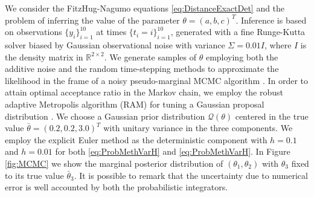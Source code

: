 \documentclass{siamart1116}
\numberwithin{theorem}{section}
\newcommand{\R}{\mathbb{R}}
\begin{document}
We consider the FitzHug-Nagumo equations \eqref{eq:DistanceExactDet} and the problem of inferring the value of the parameter $\theta = (a, b, c)^T$. Inference is based on observations $\{y_i\}_{i=1}^{10}$ at times $\{t_i = i\}_{i=1}^{10}$, generated with a fine Runge-Kutta solver biased by Gaussian observational noise with variance $\Sigma = 0.01I$, where $I$ is the density matrix in $\R^{2\times 2}$. We generate samples of $\theta$ employing both the additive noise and the random time-stepping methods to approximate the likelihood in the frame of a noisy pseudo-marginal MCMC algorithm \cite{AnR09, MLR16}. In order to attain optimal acceptance ratio in the Markov chain, we employ the robust adaptive Metropolis algorithm (RAM) for tuning a Gaussian proposal distribution \cite{Vih12}. We choose a Gaussian prior distribution $\mathcal{Q}(\theta)$ centered in the true value $\bar \theta = (0.2, 0.2, 3.0)^T$ with unitary variance in the three components. We employ the explicit Euler method as the deterministic component with $h = 0.1$ and $h = 0.01$ for both \eqref{eq:ProbMethVarH} and \eqref{eq:ProbMethVarH}. In Figure \ref{fig:MCMC} we show the marginal posterior distribution of $(\theta_1, \theta_2)$ with $\theta_3$ fixed to its true value $\bar\theta_3$. It is possible to remark that the uncertainty due to numerical error is well accounted by both the probabilistic integrators.  




\end{document}
